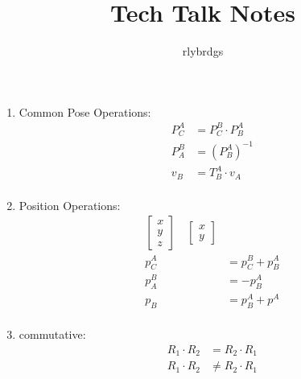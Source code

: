 \documentclass{article}
\title{Tech Talk Notes}
\author{rlybrdgs }
\begin{document}
\maketitle
\begin{enumerate}
    \item Common Pose Operations:
    \begin{align*}
        P^A_C &= P^B_C \cdot P^A_B \\
        P^B_A &= \left(P^A_B\right)^{-1} \\
        v_B &= T^A_B \cdot v_A \\
    \end{align*}

    \item Position Operations:
    \begin{align*}
        \begin{bmatrix}
            x \\ y \\ z
        \end{bmatrix} \quad \begin{bmatrix}
            x \\ y
        \end{bmatrix} \\
        p^A_C &= p^B_C + p^A_B \\
        p^B_A &= -p^A_B \\
        p_B &= p^A_B + p^A \\
    \end{align*}

    \item commutative:
    \begin{align*}
        R_1 \cdot R_2 &= R_2 \cdot R_1 \\
        R_1 \cdot R_2 &\neq R_2 \cdot R_1 \\
    \end{align*}


\end{enumerate}
\end{document}
